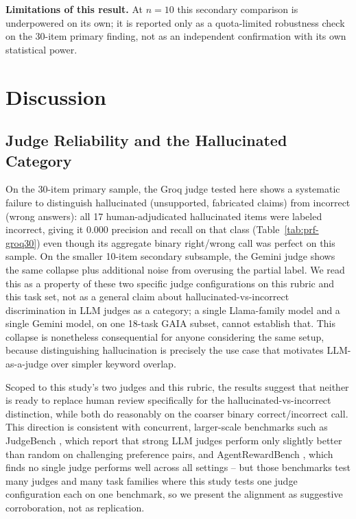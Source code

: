 \documentclass[conference]{IEEEtran}
\begin{document}
\textbf{Limitations of this result.} At $n=10$ this secondary comparison is underpowered on its own; it is reported only as a quota-limited robustness check on the 30-item primary finding, not as an independent confirmation with its own statistical power.

\section{Discussion}
\label{sec:discussion}

\subsection{Judge Reliability and the Hallucinated Category}
On the 30-item primary sample, the Groq judge tested here shows a systematic failure to distinguish hallucinated (unsupported, fabricated claims) from incorrect (wrong answers): all 17 human-adjudicated hallucinated items were labeled incorrect, giving it $0.000$ precision and recall on that class (Table~\ref{tab:prf-groq30}) even though its aggregate binary right/wrong call was perfect on this sample. On the smaller 10-item secondary subsample, the Gemini judge shows the same collapse plus additional noise from overusing the partial label. We read this as a property of these two specific judge configurations on this rubric and this task set, not as a general claim about hallucinated-vs-incorrect discrimination in LLM judges as a category; a single Llama-family model and a single Gemini model, on one 18-task GAIA subset, cannot establish that. This collapse is nonetheless consequential for anyone considering the same setup, because distinguishing hallucination is precisely the use case that motivates LLM-as-a-judge over simpler keyword overlap.

Scoped to this study's two judges and this rubric, the results suggest that neither is ready to replace human review specifically for the hallucinated-vs-incorrect distinction, while both do reasonably on the coarser binary correct/incorrect call. This direction is consistent with concurrent, larger-scale benchmarks such as JudgeBench \cite{tan2025judgebench}, which report that strong LLM judges perform only slightly better than random on challenging preference pairs, and AgentRewardBench \cite{lu2025agentrewardbench}, which finds no single judge performs well across all settings -- but those benchmarks test many judges and many task families where this study tests one judge configuration each on one benchmark, so we present the alignment as suggestive corroboration, not as replication.
\end{document}
